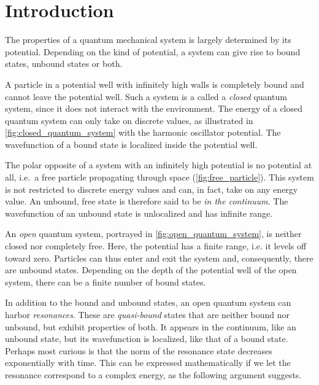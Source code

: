 \documentclass[../main/report.tex]{subfiles}
\begin{document}
\chapter{Introduction}

The properties of a quantum mechanical system is largely determined by its potential. 
Depending on the kind of potential, a system can give rise to bound states, unbound states or both.

A particle in a potential well with infinitely high walls is completely bound and cannot leave the potential well.
Such a system is a called a \emph{closed} quantum system, since it does not interact with the environment. 
The energy of a closed quantum system can only take on discrete values, as illustrated in \cref{fig:closed_quantum_system} with the harmonic oscillator potential.
The wavefunction of a bound state is localized inside the potential well.

The polar opposite of a system with an infinitely high potential is no potential at all, i.e.~a free particle propagating through space (\cref{fig:free_particle}).
This system is not restricted to discrete energy values and can, in fact, take on any energy value.
An unbound, free state is therefore said to be \emph{in the continuum}.
The wavefunction of an unbound state is unlocalized and has infinite range.

An \emph{open} quantum system, portrayed in \cref{fig:open_quantum_system}, is neither closed nor completely free.
Here, the potential has a finite range, i.e. it levels off toward zero.
Particles can thus enter and exit the system and, consequently, there are unbound states.
Depending on the depth of the potential well of the open system, there can be a finite number of bound states.

In addition to the bound and unbound states, an open quantum system can harbor \emph{resonances}. 
These are \emph{quasi-bound} states that are neither bound nor unbound, but exhibit properties of both. 
It appears in the continuum, like an unbound state, but its wavefunction is localized, like that of a bound state.
Perhaps most curious is that the norm of the resonance state decreases exponentially with time. 
This can be expressed mathematically if we let the resonance correspond to a complex energy, as the following argument suggests.
\end{document}
